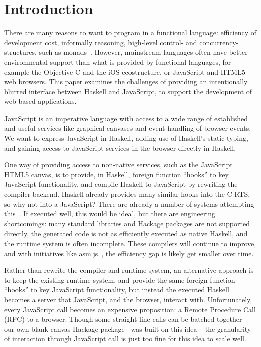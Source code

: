 \documentclass{llncs}
\begin{document}
\section{Introduction}\label{sec:intro}

There are many reasons to want to program in a functional language:
efficiency of development cost, informally reasoning, high-level 
control- and concurrency-structures, such as monads~\cite{...}.
However, mainstream languages often have better environmental support
than what is provided by functional languages,
for example the Objective C and the iOS ecostructure, or JavaScript and HTML5
web browsers.
This paper examines the challenges of providing
an intentionally blurred interface between Haskell
and JavaScript, to support the development of web-based applications.

JavaScript is an imperative language with access to a wide range
of established and useful services like graphical canvases and event
handling of browser events. 
We want to express JavaScript in Haskell, adding use
of Haskell's static typing, and gaining access to JavaScript services
in the browser directly in Haskell.


One way of providing access to non-native services,
such as the JavaScript HTML5 canvas, is to provide, in Haskell, 
foreign function ``hooks'' to key JavaScript functionality,
and compile Haskell to JavaScript by rewriting the
compiler backend.
Haskell already provides many similar hooks into the C RTS,
so why not into a JavaScript?
There are already a number of systems attempting this~\cite{...}.
If executed well, this would be ideal,
but there are engineering shortcomings: 
many standard libraries and Hackage packages are not supported directly,
the generated code is not as efficiently executed as native Haskell, and
the runtime system is often incomplete. These compilers will continue
to improve, and with initiatives like asm.js~\cite{...},
the efficiency gap is likely get smaller over time.

Rather than rewrite the compiler and runtime system,
an alternative approach is to keep the existing
runtime system, and provide the same 
foreign function ``hooks'' to key JavaScript functionality,
but instead the executed Haskell becomes a server that JavaScript,
and the browser, interact with.
Unfortunately, every JavaScript call becomes an expensive proposition: a Remote Procedure Call (RPC)
to a browser.
Though some straight-line calls can be batched together --
our own blank-canvas Hackage package~\cite{Hackage:11:blank-canvas} was built on this idea --
the granularity of interaction through JavaScript call is just too fine for
this idea to scale well.
\end{document}
